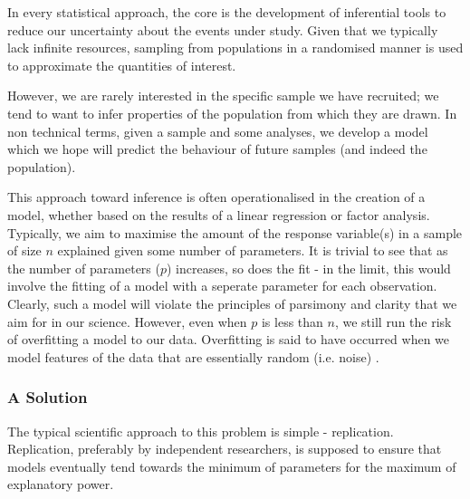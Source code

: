 In every statistical approach, the core is the development of inferential tools to reduce our uncertainty about the events under study\cite{gelman2010philosophy}. Given that we typically lack infinite resources, sampling from populations in a randomised manner is used to approximate the quantities of interest\cite{venables2002modern}.

However, we are rarely interested in the specific sample we have recruited; we tend to want to infer properties of the population  from which they are drawn.  In non technical terms, given a sample and some analyses, we develop a model which we hope will predict the behaviour of future samples (and indeed the population).

This approach toward inference is often operationalised in the creation of a model, whether based on the results of a linear regression or factor analysis. Typically, we aim to maximise the amount of the response variable(s) in a sample of size $n$ explained given some number of parameters. It is trivial to see that as the number of parameters ($p$) increases, so does the fit - in the limit, this would involve the fitting of a model with a seperate parameter for each observation. Clearly, such a model will violate the principles of parsimony and clarity that we aim for in our science. However, even when $p$ is less than $n$, we still run the risk of overfitting a model to our data. Overfitting is said to have occurred when we model features of the data that are essentially random (i.e. noise) \cite{friedman2009elements}. 


\subsubsection{A Solution}

The typical scientific approach to this problem is simple - replication. Replication, preferably by independent researchers, is supposed to ensure that models eventually tend towards the minimum of parameters for the maximum of explanatory power.

